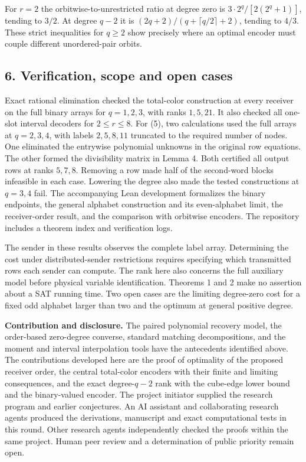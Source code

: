 \documentclass[
  10pt,
]{article}
\begin{document}
For \(r=2\) the orbitwise-to-unrestricted ratio at degree zero is
\(3\cdot2^q/[2(2^q+1)]\), tending to \(3/2\). At degree \(q-2\) it is
\((2q+2)/(q+\lceil q/2\rceil+2)\), tending to \(4/3\). These strict
inequalities for \(q\ge2\) show precisely where an optimal encoder must
couple different unordered-pair orbits.

\subsection{6. Verification, scope and open
cases}\label{verification-scope-and-open-cases}

Exact rational elimination checked the total-color construction at every
receiver on the full binary arrays for \(q=1,2,3\), with ranks
\(1,5,21\). It also checked all one-slot interval decoders for
\(2\le r\le8\). For (5), two calculations used the full arrays at
\(q=2,3,4\), with labels \(2,5,8,11\) truncated to the required number
of nodes. One eliminated the entrywise polynomial unknowns in the
original row equations. The other formed the divisibility matrix in
Lemma 4. Both certified all output rows at ranks \(5,7,8\). Removing a
row made half of the second-word blocks infeasible in each case.
Lowering the degree also made the tested constructions at \(q=3,4\)
fail. The accompanying Lean development formalizes the binary endpoints,
the general alphabet construction and its even-alphabet limit, the
receiver-order result, and the comparison with orbitwise encoders.
The repository includes a theorem index and verification logs.

The sender in these results observes the complete label array.
Determining the cost under distributed-sender restrictions requires
specifying which transmitted rows each sender can compute. The rank here
also concerns the full auxiliary model before physical variable
identification. Theorems 1 and 2 make no assertion about a SAT running
time. Two open cases are the limiting degree-zero cost for a fixed odd
alphabet larger than two and the optimum at general positive degree.

\textbf{Contribution and disclosure.} The paired polynomial recovery
model, the order-based zero-degree converse, standard matching
decompositions, and the moment and interval interpolation tools have the
antecedents identified above. The contributions developed here are the
proof of optimality of the proposed receiver order, the central
total-color encoders with their finite and limiting consequences, and
the exact degree-\(q-2\) rank with the cube-edge lower bound and the
binary-valued encoder. The project initiator supplied the research
program and earlier conjectures. An AI assistant and collaborating
research agents produced the derivations, manuscript and exact
computational tests in this round. Other research agents independently
checked the proofs within the same project. Human peer review and a
determination of public priority remain open.
\end{document}
